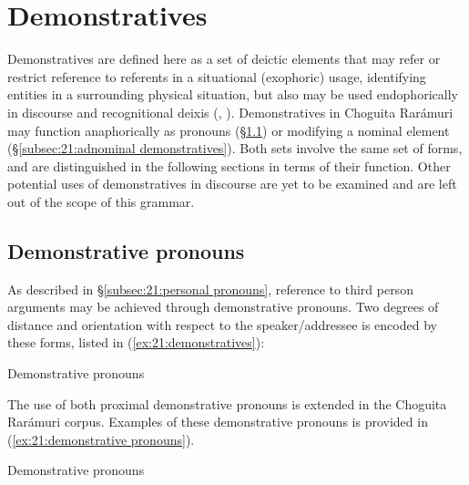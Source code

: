 \section{Demonstratives}
\label{sec:21:demonstratives}

Demonstratives are defined here as a set of deictic elements that may refer or restrict reference to referents in a situational (exophoric) usage, identifying entities in a surrounding physical situation, but also may be used endophorically  in discourse and recognitional deixis (\citealt{himmelmann1996demonstratives}, \citealt{enfield2003demonstratives}). Demonstratives in Choguita Rarámuri may function anaphorically as pronouns (§\ref{subsec:21:demonstrative pronouns}) or modifying a nominal element (§\ref{subsec:21:adnominal demonstratives}). Both sets involve the same set of forms, and are distinguished in the following sections in terms of their function. Other potential uses of demonstratives in discourse are yet to be examined and are left out of the scope of this grammar.

\subsection{Demonstrative pronouns}
\label{subsec:21:demonstrative pronouns}

As described in §\ref{subsec:21:personal pronouns}, reference to third person arguments may be achieved through demonstrative pronouns. Two degrees of distance and orientation with respect to the speaker/addressee is encoded by these forms, listed in (\ref{ex:21:demonstratives}):

\ea\label{ex:21:demonstratives}
{Demonstrative pronouns}

    \z
\z

The use of both proximal demonstrative pronouns is extended in the Choguita Rarámuri corpus. Examples of these demonstrative pronouns is provided in (\ref{ex:21:demonstrative pronouns}).

\ea\label{ex:21:demonstrative pronouns}
{Demonstrative pronouns}

